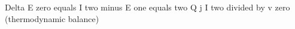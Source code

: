 Delta E zero equals I two minus E one equals two Q j I two divided by v zero (thermodynamic balance)